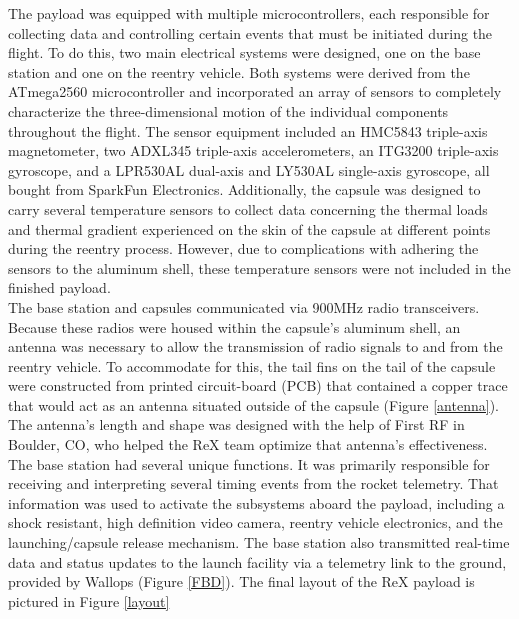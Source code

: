 \documentclass{article}
\begin{document}
\begin{doublespace}
		\indent The payload was equipped with multiple microcontrollers, each responsible for collecting data and controlling certain events that must be initiated during the flight. To do this, two main electrical systems were designed, one on the base station and one on the reentry vehicle. Both systems were derived from the ATmega2560 microcontroller and incorporated an array of sensors to completely characterize the three-dimensional motion of the individual components throughout the flight. The sensor equipment included an HMC5843 triple-axis magnetometer, two ADXL345 triple-axis accelerometers, an ITG3200 triple-axis gyroscope, and a LPR530AL dual-axis and LY530AL single-axis gyroscope, all bought from SparkFun Electronics. Additionally, the capsule was designed to carry several temperature sensors to collect data concerning the thermal loads and thermal gradient experienced on the skin of the capsule at different points during the reentry process. However, due to complications with adhering the sensors to the aluminum shell, these temperature sensors were not included in the finished payload.\\
		\indent The base station and capsules communicated via 900MHz radio transceivers. Because these radios were housed within the capsule's aluminum shell, an antenna was necessary to allow the transmission of radio signals to and from the reentry vehicle. To accommodate for this, the tail fins on the tail of the capsule were constructed from printed circuit-board (PCB) that contained a copper trace that would act as an antenna situated outside of the capsule (Figure \ref{antenna}). The antenna's length and shape was designed with the help of First RF in Boulder, CO, who helped the ReX team optimize that antenna's effectiveness.\\
		\indent The base station had several unique functions. It was primarily responsible for receiving and interpreting several timing events from the rocket telemetry. That information was used to activate the subsystems aboard the payload, including a shock resistant, high definition video camera, reentry vehicle electronics, and the launching/capsule release mechanism. The base station also transmitted real-time data and status updates to the launch facility via a telemetry link to the ground, provided by Wallops (Figure \ref{FBD}). The final layout of the ReX payload is pictured in Figure \ref{layout}

\end{doublespace}
\end{document}
